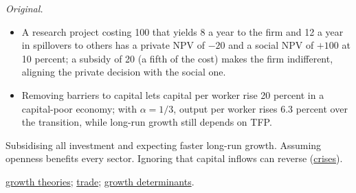 \begin{qfdefinition}
 \emph{Original.}
\begin{itemize}
\item A research project costing 100 that yields 8 a year to the firm and 12 a year in spillovers to others has a private NPV of $-20$ and a social NPV of $+100$ at 10 percent; a subsidy of 20 (a fifth of the cost) makes the firm indifferent, aligning the private decision with the social one.
\item Removing barriers to capital lets capital per worker rise 20 percent in a capital-poor economy; with $\alpha=1/3$, output per worker rises 6.3 percent over the transition, while long-run growth still depends on TFP.
\end{itemize}

 Subsidising all investment and expecting faster long-run growth. Assuming openness benefits every sector. Ignoring that capital inflows can reverse (\hyperref[def:flows-policy-exchange-rates]{crises}).

 \hyperref[mod:growth-theories-convergence]{growth theories}; \hyperref[meth:trade-benefits-restrictions-blocs]{trade}; \hyperref[def:growth-determinants-factors]{growth determinants}.

\end{qfdefinition}
